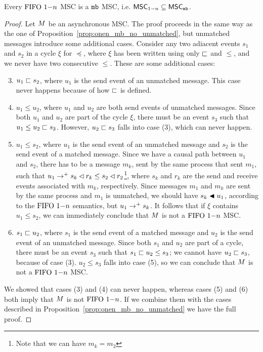 \begin{proposition} \label{prop:onen_mb_unmatched}
	Every $\text{FIFO } 1\mathsf{-}n$ MSC is a $\mathtt{mb}$ MSC, i.e. $\mathsf{MSC}_{1\mathsf{-}n} \subseteq \mathsf{MSC}_{\mathtt{mb}}$.
\end{proposition}
\begin{proof}
Let $M$ be an asynchronous MSC. The proof proceeds in the same way as the one of Proposition~\ref{prop:onen_mb_no_unmatched}, but unmatched messages introduce some additional cases. Consider any two adiacent events $s_1$ and $s_2$ in a cycle $\xi$ for $\preceq$, where $\xi$ has been written using only $\sqsubset$ and $\le$, and we never have two consecutive $\le$. These are some additional cases:
\begin{enumerate}\setcounter{enumi}{2}
	\item $u_1 \sqsubset s_2$, where $u_1$ is the send event of an unmatched message. This case never happens because of how $\sqsubset$ is defined.
	\item $u_1 \le u_2$, where $u_1$ and $u_2$ are both send events of unmatched messages. Since both $u_1$ and $u_2$ are part of the cycle $\xi$, there must be an event $s_3$ such that $u_1 \le u_2 \sqsubset s_3$. However, $u_2 \sqsubset s_3$ falls into case (3), which can never happen.
	\item $u_1 \le s_2$, where $u_1$ is the send event of an unmatched message and $s_2$ is the send event of a matched message. Since we have a causal path between $u_1$ and $s_2$, there has to be a message $m_k$, sent by the same process that sent $m_1$, such that $u_1 \to^+ s_k \lhd r_k \le s_2 \lhd r_2$\footnote{Note that we can have $m_k = m_2$}, where $s_k$ and $r_k$ are the send and receive events associated with $m_k$, respectively. Since messages $m_1$ and $m_k$ are sent by the same process and $m_1$ is unmatched, we should have $s_k \blacktriangleleft u_1$, according to the $\text{FIFO } 1\mathsf{-}n$ semantics, but $u_1 \to^+ s_k$. It follows that if $\xi$ contains $u_1 \le s_2$, we can immediately conclude that $M$ is not a $\text{FIFO } 1\mathsf{-}n$ MSC.
	\item $s_1 \sqsubset u_2$,  where $s_1$ is the send event of a matched message and $u_2$ is the send event of an unmatched message. Since both $s_1$ and $u_2$ are part of a cycle, there must be an event $s_3$ such that $s_1 \sqsubset u_2 \le s_3$; we cannot have $u_2 \sqsubset s_3$, because of case (3). $u_2 \le s_3$ falls into case (5), so we can conclude that $M$ is not a $\text{FIFO } 1\mathsf{-}n$ MSC.
\end{enumerate}
We showed that cases (3) and (4) can never happen, whereas cases (5) and (6) both imply that $M$ is not $\text{FIFO } 1\mathsf{-}n$. If we combine them with the cases described in Proposition~\ref{prop:onen_mb_no_unmatched} we have the full proof.
\end{proof}


